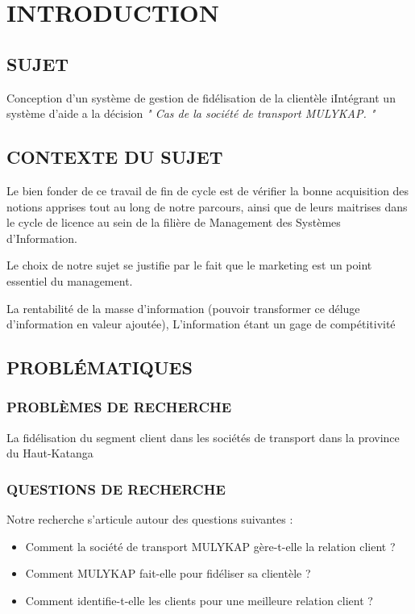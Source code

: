 \documentclass[a4paper,12pt,oneside]{book}
\begin{document}
\chapter[INTRODUCTION]{INTRODUCTION}
\section[Sujet]{SUJET}
\begin{center}
    Conception d’un système de gestion de fidélisation
    de la clientèle
    iIntégrant un système d’aide a la décision 
    \textit{" Cas de la société de transport MULYKAP. "}        
\end{center}

\section[Context du sujet]{CONTEXTE DU SUJET}
Le bien fonder de ce travail de fin de cycle est de
vérifier la bonne acquisition des notions apprises tout
au long de notre parcours, ainsi que de leurs maitrises
dans le cycle de licence au sein de la filière de Management
des Systèmes d’Information.

\par Le choix de notre sujet se justifie par le fait que le marketing 
est un point essentiel du management.
\par La rentabilité de la masse d’information (pouvoir transformer
ce déluge d’information en valeur ajoutée), L’information étant
un gage de compétitivité %
\section[Problématique]{PROBLÉMATIQUES}
\subsection[Problèmes de recherche]{PROBLÈMES DE RECHERCHE}
La fidélisation du segment client dans les sociétés de transport
dans la province du Haut-Katanga 
\subsection[Questions de recherche]{QUESTIONS DE RECHERCHE}
Notre recherche s’articule autour des questions suivantes : 
\begin{itemize}
    \item Comment la société de transport MULYKAP gère-t-elle
    la relation client ?
    \item Comment MULYKAP fait-elle pour fidéliser sa clientèle ?
    \item Comment identifie-t-elle les clients pour une
    meilleure relation client ?
\end{itemize}
\end{document}
